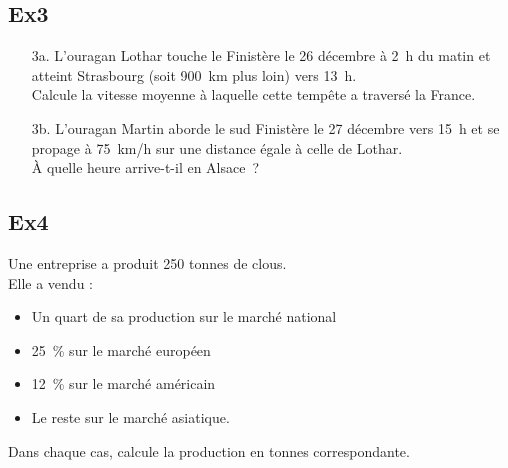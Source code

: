 \documentclass[12pt]{article}
\begin{document}
\begin{multicols}{2}
\subsection*{Ex3}
\begin{itemize}
\item[3a.] L'ouragan Lothar touche le Finistère le 26 décembre à 2 h du matin et atteint Strasbourg (soit 900 km plus loin) vers 13 h. \\
Calcule la vitesse moyenne à laquelle cette tempête a traversé la France.
\item[3b.] L'ouragan Martin aborde le sud Finistère le 27 décembre vers 15 h et se propage à 75 km/h sur une distance égale à celle de Lothar. \\
À quelle heure arrive-t-il en Alsace ?
\end{itemize}

\subsection*{Ex4}
Une entreprise a produit 250 tonnes de clous.\\
Elle a vendu : 
\begin{itemize}
\item Un quart de sa production sur le marché national
\item 25 \% sur le marché européen
\item 12 \% sur le marché américain
\item Le reste sur le marché asiatique.
\end{itemize}

 Dans chaque cas, calcule la production en tonnes correspondante.
\end{multicols}
\end{document}
